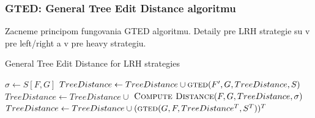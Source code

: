 \subsubsection{GTED: General Tree Edit Distance algoritmu}

Zacneme principom fungovania GTED algoritmu. Detaily pre LRH strategie su
v \citet{ZHANGSHASHA} pre left/right a v \citet{DMRW} pre heavy strategiu.

\begin{algorithm}
  \caption{General Tree Edit Distance for LRH strategies}
  \label{alg:gted}
  \begin{algorithmic}[1]
      \State $\sigma \gets S[F, G]$
          \State $TreeDistance \gets TreeDistance \cup \Call{gted}{F', G, TreeDistance, S}$
        \EndFor
        \State $TreeDistance \gets TreeDistance \cup$
        \Indent
          \State $\Call{Compute Distance}{F, G, TreeDistance, \sigma}$
        \EndIndent
      \Else
        \State $TreeDistance \gets TreeDistance \cup (\Call{gted}{G, F, TreeDistance^{T}, S^{T}})^{T}$
      \EndIf
      \State {}
    \EndProcedure
  \end{algorithmic}
\end{algorithm}


